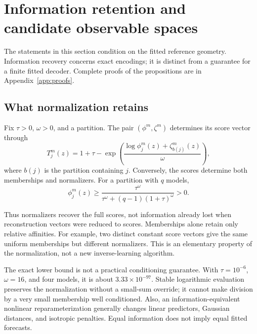 \section{Information retention and candidate observable spaces}\label{sec:analysis}
The statements in this section condition on the fitted reference geometry. Information recovery concerns exact encodings; it is distinct from a guarantee for a finite fitted decoder. Complete proofs of the propositions are in Appendix~\ref{app:proofs}.

\subsection{What normalization retains}
\begin{proposition}\label{prop:normalizer}
Fix $\tau>0$, $\omega>0$, and a partition. The pair $(\phi^m,\zeta^m)$ determines its score vector through
\begin{equation}
 T_j^m(z)=1+\tau-\exp\left(\frac{\log\phi_j^m(z)+\zeta_{b(j)}^m(z)}{\omega}\right),
\label{eq:inverse}
\end{equation}
where $b(j)$ is the partition containing $j$. Conversely, the scores determine both memberships and normalizers. For a partition with $q$ models,
\[
 \phi_j^m(z)\geq\frac{\tau^\omega}{\tau^\omega+(q-1)(1+\tau)^\omega}>0.
\]
\end{proposition}
Thus normalizers recover the full scores, not information already lost when reconstruction vectors were reduced to scores. Memberships alone retain only relative affinities. For example, two distinct constant score vectors give the same uniform memberships but different normalizers. This is an elementary property of the normalization, not a new inverse-learning algorithm.

The exact lower bound is not a practical conditioning guarantee. With $\tau=10^{-6}$, $\omega=16$, and four models, it is about $3.33\times10^{-97}$. Stable logarithmic evaluation preserves the normalization without a small-sum override; it cannot make division by a very small membership well conditioned. Also, an information-equivalent nonlinear reparameterization generally changes linear predictors, Gaussian distances, and isotropic penalties. Equal information does not imply equal fitted forecasts.

